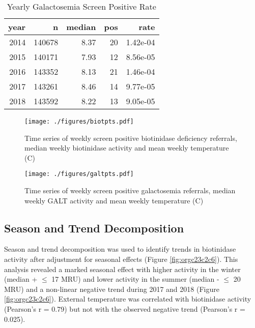 \documentclass[review]{elsarticle}
\begin{document}
\begin{table}[ht]
\centering
\begin{tabular}{rrrrr}
  \hline
year & n & median & pos & rate \\ 
  \hline
2014 & 140678 & 8.37 &  20 & 1.42e-04 \\ 
  2015 & 140171 & 7.93 &  12 & 8.56e-05 \\ 
  2016 & 143352 & 8.13 &  21 & 1.46e-04 \\ 
  2017 & 143261 & 8.46 &  14 & 9.77e-05 \\ 
  2018 & 143592 & 8.22 &  13 & 9.05e-05 \\ 
   \hline
\end{tabular}
\caption{Yearly Galactosemia Screen Positive Rate} 
\label{tab:galt_year}
\end{table}

\begin{figure}[htbp]
\centering
\texttt{[image: ./figures/biotpts.pdf]}
\caption{\label{fig:org00af45b}Time series of weekly screen positive biotinidase deficiency referrals, median weekly biotinidase activity and mean weekly temperature (\degree{}C)}
\end{figure}

\begin{figure}[htbp]
\centering
\texttt{[image: ./figures/galtpts.pdf]}
\caption{\label{fig:orgd80f6e1}Time series of weekly screen positive galactosemia referrals, median weekly GALT activity and mean weekly temperature (\degree{}C)}
\end{figure}

\clearpage

\subsection*{Season and Trend Decomposition}
\label{sec:orga2ab1b8}
Season and trend decomposition was used to identify trends in
biotinidase activity after adjustment for seasonal effects (Figure
\ref{fig:orgc23c2c6}). This analysis revealed a marked seasonal effect with
higher activity in the winter (median + \(\le\) 17 MRU) and lower activity
in the summer (median - \(\le\) 20 MRU) and a non-linear negative trend
during 2017 and 2018 (Figure \ref{fig:orgc23c2c6}). External temperature was
correlated with biotinidase activity (Pearson's r = 0.79) but not with
the observed negative trend (Pearson's r = 0.025).
\end{document}
